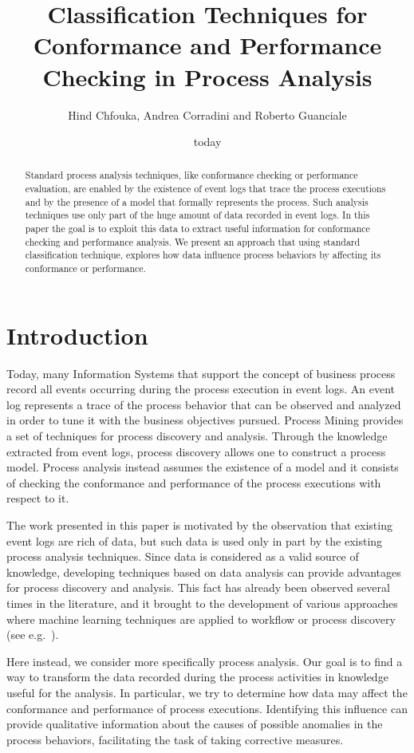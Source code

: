 \documentclass{llncs}
\title{Classification Techniques for Conformance and Performance Checking in Process Analysis}
\author{Hind Chfouka\inst{1}, Andrea Corradini\inst{1} and Roberto Guanciale\inst{2}}
\institute{Department of Computer Science, University of Pisa, Italy \\ 
\email{\{chfouka,andrea\}@di.unipi.it}\and School of Computer Science and Communication,
KTH Royal Institute of Technology, Stockholm, Sweden \\
\email{robertog@kth.se}}
\date{today}
\begin{document}
\maketitle
\begin{abstract}
Standard process analysis techniques, like conformance checking or performance evaluation, are enabled by the existence of event logs that trace the process executions and by the presence of a model that formally represents the process. Such analysis techniques use only part of the huge amount of data recorded in event logs. In this paper the goal is to exploit this data to extract useful information for  conformance checking and  performance analysis. We present an approach that using standard classification technique, explores how data influence process behaviors by affecting its conformance or performance.
\end{abstract}

\section{Introduction}
Today, many Information Systems that support  the concept of business process record all events occurring during the process execution in  event logs. An event log represents a trace of the process behavior that can be observed and analyzed in order to tune it with the business objectives pursued. Process Mining provides a set of techniques for process discovery and analysis. Through the knowledge extracted from event logs, process discovery allows one to construct a process model. Process analysis instead assumes the existence of a model and it consists of checking the conformance and performance of the process executions with respect to it.

The work presented in this paper is motivated by the observation that existing event logs are rich of data, but such data is used only in part by the existing process analysis techniques. Since data is considered as a valid source of knowledge, developing techniques based on data analysis can provide advantages for  process discovery and analysis.
This fact has already been observed several times in the literature, and it brought to the development of various approaches where machine learning techniques are applied to workflow or process discovery (see e.g.~\cite{DBLP:conf/ecml/Herbst00,Maruster-PHD,DBLP:conf/bpm/RozinatA06,DBLP:conf/sac/LeoniA13}).

Here instead, we consider more specifically process analysis. Our goal is to find a way to transform the data recorded during the process activities in knowledge useful for the analysis.  In particular,  we try to determine how data may affect the conformance and performance of process executions. Identifying this influence can provide qualitative information about the causes of possible anomalies in the process behaviors, facilitating the task of taking corrective measures.
\end{document}
